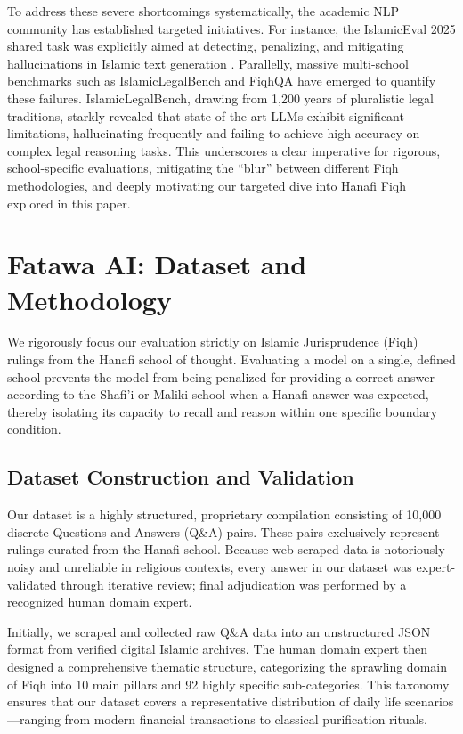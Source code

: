 To address these severe shortcomings systematically, the academic NLP community has established targeted initiatives. For instance, the IslamicEval 2025 shared task was explicitly aimed at detecting, penalizing, and mitigating hallucinations in Islamic text generation \cite{islamicEval2025}. Parallelly, massive multi-school benchmarks such as IslamicLegalBench \cite{elmahjub2026islamiclegalbench} and FiqhQA \cite{atif2025fiqhqa} have emerged to quantify these failures. IslamicLegalBench, drawing from 1,200 years of pluralistic legal traditions, starkly revealed that state-of-the-art LLMs exhibit significant limitations, hallucinating frequently and failing to achieve high accuracy on complex legal reasoning tasks. This underscores a clear imperative for rigorous, school-specific evaluations, mitigating the ``blur'' between different Fiqh methodologies, and deeply motivating our targeted dive into Hanafi Fiqh explored in this paper.

\section{Fatawa AI: Dataset and Methodology}

We rigorously focus our evaluation strictly on Islamic Jurisprudence (Fiqh) rulings from the Hanafi school of thought. Evaluating a model on a single, defined school prevents the model from being penalized for providing a correct answer according to the Shafi'i or Maliki school when a Hanafi answer was expected, thereby isolating its capacity to recall and reason within one specific boundary condition.

\subsection{Dataset Construction and Validation}
Our dataset is a highly structured, proprietary compilation consisting of 10,000 discrete Questions and Answers (Q\&A) pairs. These pairs exclusively represent rulings curated from the Hanafi school. Because web-scraped data is notoriously noisy and unreliable in religious contexts, every answer in our dataset was expert-validated through iterative review; final adjudication was performed by a recognized human domain expert.

Initially, we scraped and collected raw Q\&A data into an unstructured JSON format from verified digital Islamic archives. The human domain expert then designed a comprehensive thematic structure, categorizing the sprawling domain of Fiqh into 10 main pillars and 92 highly specific sub-categories. This taxonomy ensures that our dataset covers a representative distribution of daily life scenarios---ranging from modern financial transactions to classical purification rituals.

